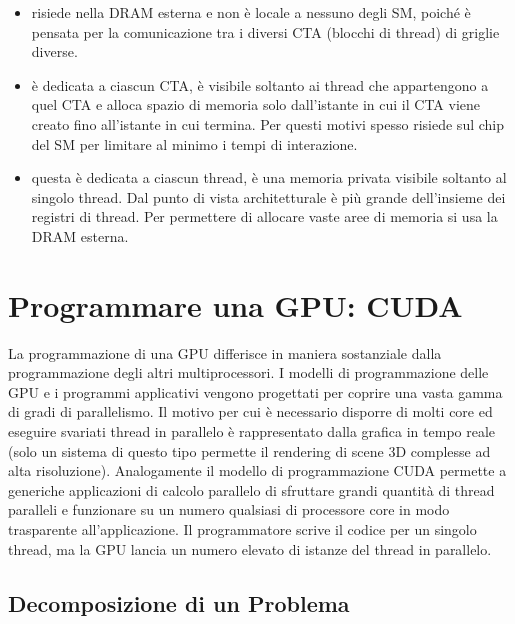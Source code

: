\begin{itemize}
  \item {} risiede nella DRAM esterna e non è locale a nessuno degli SM, poiché è pensata per la comunicazione tra i diversi CTA (blocchi di thread) di griglie diverse. 
  \item {} è dedicata a ciascun CTA, è visibile soltanto ai thread che appartengono a quel CTA e alloca spazio di memoria solo dall'istante in cui il CTA viene creato fino all'istante in cui termina. Per questi motivi spesso risiede sul chip del SM per limitare al minimo i tempi di interazione. 
  \item {} questa è dedicata a ciascun thread, è una memoria privata visibile soltanto al singolo thread. Dal punto di vista architetturale è più grande dell'insieme dei registri di thread. Per permettere di allocare vaste aree di memoria si usa la DRAM esterna.
\end{itemize} 


\section{Programmare una GPU: CUDA}

La programmazione di una GPU differisce in maniera sostanziale dalla programmazione degli altri multiprocessori. I modelli di programmazione delle GPU e i programmi applicativi vengono progettati per coprire una vasta gamma di gradi di parallelismo. Il motivo per cui è necessario disporre di molti core ed eseguire svariati thread in parallelo è rappresentato dalla grafica in tempo reale (solo un sistema di questo tipo permette il rendering di scene 3D complesse ad alta risoluzione). Analogamente il modello di programmazione CUDA permette a generiche applicazioni di calcolo parallelo di sfruttare grandi quantità di thread paralleli e funzionare su un numero qualsiasi di processore core in modo trasparente all'applicazione. Il programmatore scrive il codice per un singolo thread, ma la GPU lancia un numero elevato di istanze del thread in parallelo. 

\subsection{Decomposizione di un Problema}

